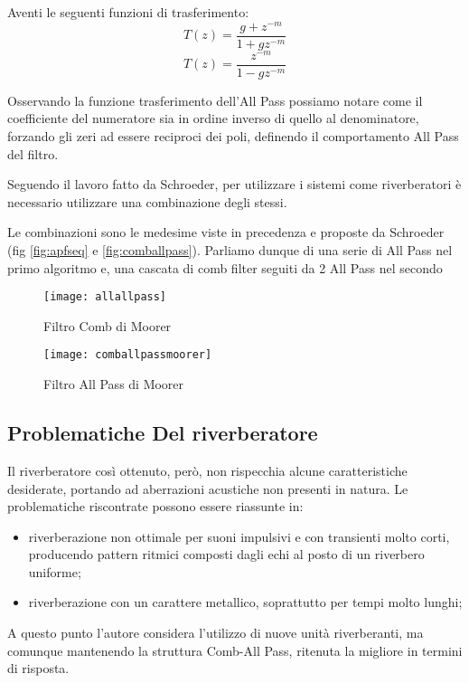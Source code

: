 Aventi le seguenti funzioni di trasferimento:
\begin{equation}
T(z) = \frac{g + z^{-m}}{1+gz^{-m}}
\end{equation}
\begin{equation}
T(z) = \frac{z^{-m}}{1-gz^{-m}}
\end{equation}

Osservando la funzione trasferimento dell’All Pass possiamo notare come il coefficiente del numeratore sia in ordine inverso di quello al denominatore, forzando gli zeri ad essere reciproci dei poli, definendo il comportamento All Pass del filtro.

Seguendo il lavoro fatto da Schroeder, per utilizzare i sistemi come riverberatori è necessario utilizzare una combinazione degli stessi.

Le combinazioni sono le medesime viste in precedenza e proposte da Schroeder (fig \ref{fig:apfseq} e \ref{fig:comballpass}). Parliamo dunque di una serie di All Pass nel primo algoritmo e, una cascata di comb filter seguiti da 2 All Pass nel secondo

\begin{figure}[htp]
\centering
\texttt{[image: allallpass]}
\caption{Filtro Comb di Moorer}
\label{fig:allallpass}
\texttt{[image: comballpassmoorer]}
\caption{Filtro All Pass di Moorer}
\label{fig:comballpassmoorerB}
\end{figure}

\subsection{Problematiche Del riverberatore}

Il riverberatore così ottenuto, però, non rispecchia alcune caratteristiche desiderate, portando ad aberrazioni acustiche non presenti in natura.
Le problematiche riscontrate possono essere riassunte in:

\begin{itemize}
\item riverberazione non ottimale per suoni impulsivi e con transienti molto corti, producendo pattern ritmici composti dagli echi al posto di un riverbero uniforme;
\item riverberazione con un carattere metallico, soprattutto per tempi molto lunghi;
\end{itemize}

A questo punto l’autore considera l’utilizzo di nuove unità riverberanti, ma comunque mantenendo la struttura Comb-All Pass, ritenuta la migliore in termini di risposta.

